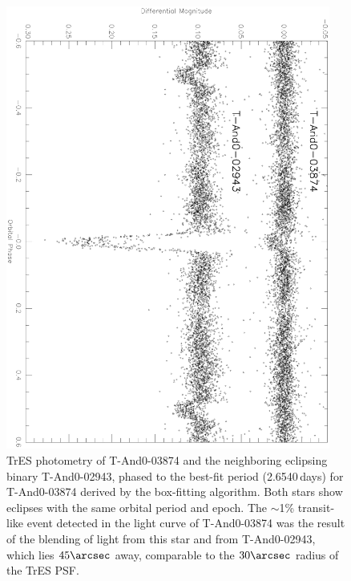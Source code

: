 \begin{figure}
\begin{center}
\includegraphics[angle=90, width=0.95\textwidth]{2_f7}
\caption[TrES photometry of \mbox{T-And0-03874} and the neighboring binary]{TrES photometry of \mbox{T-And0-03874} and the neighboring eclipsing binary \mbox{T-And0-02943}, phased to the best-fit period (2.6540\,days) for \mbox{T-And0-03874} derived by the box-fitting algorithm. Both stars show eclipses with the same orbital period and epoch. The $\sim$1\% transit-like event detected in the light curve of \mbox{T-And0-03874} was the result of the blending of light from this star and from \mbox{T-And0-02943}, which lies $45\arcsec$ away, comparable to the $30\arcsec$ radius of the TrES PSF. }
\label{cha:and0:fig:compblend}
\end{center}
\end{figure}

